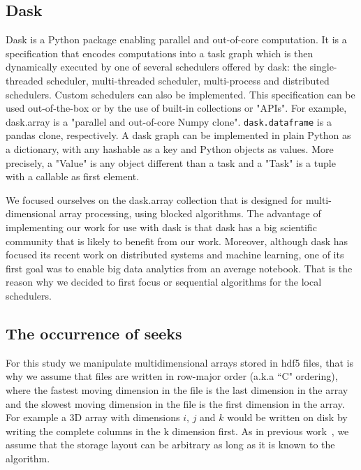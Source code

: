 \documentclass[conference]{IEEEtran}
\begin{document}
\subsection{Dask}

Dask is a Python package enabling parallel and out-of-core computation. It is
a specification that encodes computations into a task graph which is then
dynamically executed by one of several schedulers offered by dask: the
single-threaded scheduler, multi-threaded scheduler, multi-process and
distributed schedulers. Custom schedulers can also be implemented. This
specification can be used out-of-the-box or by the use of built-in collections
or "APIs". For example, dask.array is a "parallel and out-of-core Numpy clone".
\texttt{dask.dataframe} is a pandas clone, respectively. A dask graph can be
implemented in plain Python as a dictionary, with any hashable as a key and
Python objects as values. More precisely, a "Value" is any object different than
a task and a "Task" is a tuple with a callable as first element.

We focused ourselves on the dask.array collection that is designed for
multi-dimensional array processing, using blocked algorithms. The advantage of
implementing our work for use with dask is that dask has a big scientific
community that is likely to benefit from our work. Moreover, although dask has
focused its recent work on distributed systems and machine learning, one of its
first goal was to enable big data analytics from an average notebook. That is
the reason why we decided to first focus or sequential algorithms for the
local schedulers.

\subsection{The occurrence of seeks}
For this study we manipulate multidimensional arrays stored in hdf5 files,
that is why we assume that files are written in row-major order (a.k.a ``C" ordering),
where the fastest moving dimension in the file is the last dimension in the
array and the slowest moving dimension in the file is the first dimension
in the array. For example a 3D array with dimensions $i$, $j$ and $k$ would be
written on disk by writing the complete columns in the k dimension first.
As in previous work~\cite{seqalgorithms}, we assume that the storage layout can
be arbitrary as long as it is known to the algorithm.
\end{document}
